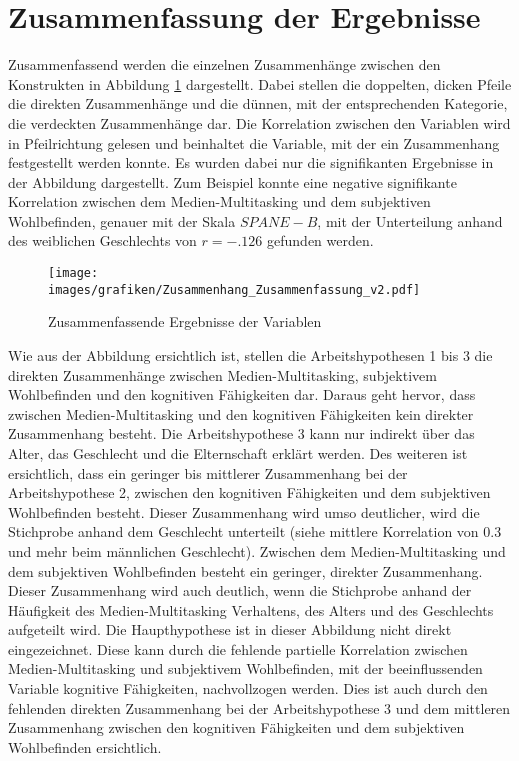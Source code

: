 \section{Zusammenfassung der Ergebnisse}\label{label.ergebnisse.zusammenfassung}
Zusammenfassend werden die einzelnen Zusammenhänge zwischen den Konstrukten in Abbildung \ref{pic.ergebniss.zusammenfassung} dargestellt. Dabei stellen die doppelten, dicken Pfeile die direkten Zusammenhänge und die dünnen, mit der entsprechenden Kategorie, die verdeckten Zusammenhänge dar. Die Korrelation zwischen den Variablen wird in Pfeilrichtung gelesen und beinhaltet die Variable, mit der ein Zusammenhang festgestellt werden konnte. Es wurden dabei nur die signifikanten Ergebnisse in der Abbildung dargestellt. Zum Beispiel konnte eine negative signifikante Korrelation zwischen dem Medien-Multitasking und dem subjektiven Wohlbefinden, genauer mit der Skala $SPANE-B$, mit der Unterteilung anhand des weiblichen Geschlechts von $r=-.126$ gefunden werden.
\begin{figure}[h]
    \centering
    \texttt{[image: images/grafiken/Zusammenhang\_Zusammenfassung\_v2.pdf]}
     \caption{Zusammenfassende Ergebnisse der Variablen}
     \label{pic.ergebniss.zusammenfassung}
\end{figure}
Wie aus der Abbildung ersichtlich ist, stellen die Arbeitshypothesen 1 bis 3 die direkten Zusammenhänge zwischen Medien-Multitasking, subjektivem Wohlbefinden und den kognitiven Fähigkeiten dar. Daraus geht hervor, dass zwischen Medien-Multitasking und den kognitiven Fähigkeiten kein direkter Zusammenhang besteht. Die Arbeitshypothese 3 kann nur indirekt über das Alter, das Geschlecht und die Elternschaft erklärt werden. Des weiteren ist ersichtlich, dass ein geringer bis mittlerer Zusammenhang bei der Arbeitshypothese 2, zwischen den kognitiven Fähigkeiten und dem subjektiven Wohlbefinden besteht. Dieser Zusammenhang wird umso deutlicher, wird die Stichprobe anhand dem Geschlecht unterteilt (siehe mittlere Korrelation von 0.3 und mehr beim männlichen Geschlecht). Zwischen dem Medien-Multitasking und dem subjektiven Wohlbefinden besteht ein geringer, direkter Zusammenhang. Dieser Zusammenhang wird auch deutlich, wenn die Stichprobe anhand der Häufigkeit des Medien-Multitasking Verhaltens, des Alters und des Geschlechts aufgeteilt wird. Die Haupthypothese ist in dieser Abbildung nicht direkt eingezeichnet. Diese kann durch die fehlende partielle Korrelation zwischen Medien-Multitasking und subjektivem Wohlbefinden, mit der beeinflussenden Variable kognitive Fähigkeiten, nachvollzogen werden. Dies ist auch durch den fehlenden direkten Zusammenhang bei der Arbeitshypothese 3 und dem mittleren Zusammenhang zwischen den kognitiven Fähigkeiten und dem subjektiven Wohlbefinden ersichtlich.  




